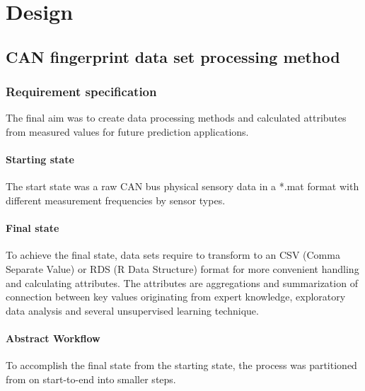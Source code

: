 \chapter{Design}
\section{CAN fingerprint data set processing method}
\subsection{Requirement specification}
	\noindent
The final aim was to create data processing methods and calculated attributes from measured values for future prediction applications.
	\subsubsection{Starting state}
The start state was a raw CAN bus physical sensory data in a *.mat format with different measurement frequencies by sensor types.
	\subsubsection{Final state}
		\noindent
To achieve the final state, data sets require to transform to an CSV (Comma Separate Value) or RDS (R Data Structure) format for more convenient handling and calculating attributes.
		\noindent
The attributes are aggregations and summarization of connection between key values originating from expert knowledge, exploratory data analysis and several unsupervised learning technique.
\subsubsection{Abstract Workflow}
To accomplish the final state from the starting state, the process was partitioned from on start-to-end into smaller steps. 


